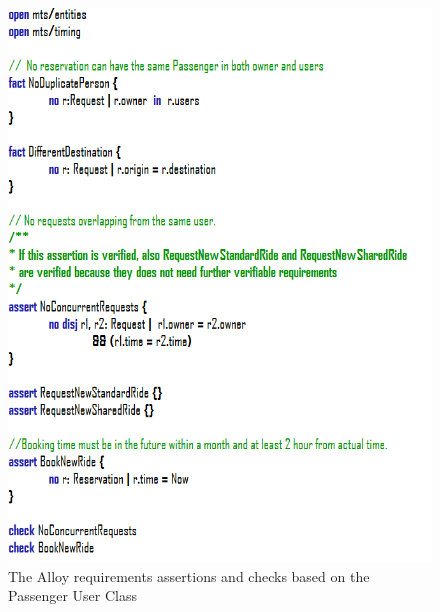 \documentclass{article}
\begin{document}
\begin{figure}[h!]
        \centering
        \includegraphics[width=1\columnwidth]{alloy/UC-Passenger}
        \caption{The Alloy requirements assertions and checks based on the Passenger User Class}
        \label{fig:alloy-passenger}
    \end{figure}
    
\end{document}
